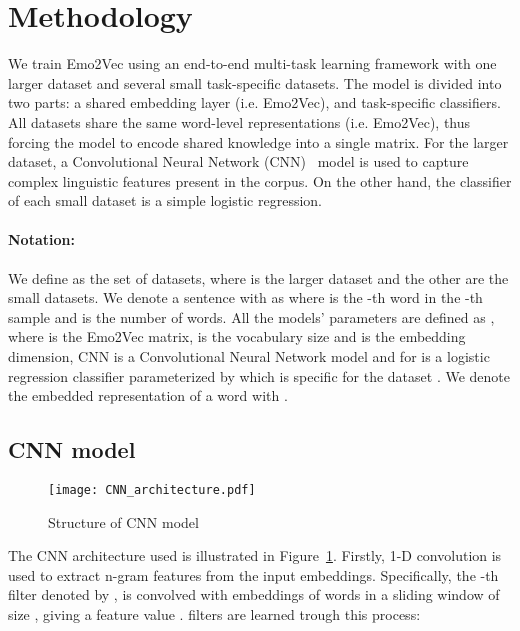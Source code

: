 \documentclass[11pt,a4paper]{article}
\begin{document}
\section{Methodology}
We train Emo2Vec using an end-to-end multi-task learning framework with one larger dataset and several small task-specific datasets. The model is divided into two parts: a shared embedding layer (i.e. Emo2Vec), and task-specific classifiers. All datasets share the same word-level representations (i.e. Emo2Vec), thus forcing the model to encode shared knowledge into a single matrix. For the larger dataset, a Convolutional Neural Network (CNN)~\cite{lecun1998gradient} model is used to capture complex linguistic features present in the corpus. On the other hand, the classifier of each small dataset is a simple logistic regression. 

\paragraph{Notation:} We define  as the set of  datasets, where  is the larger dataset and the other  are the small datasets. We denote a sentence  with  as  where  is the -th word in the -th sample and  is the number of words. All the models' parameters are defined as , where  is the Emo2Vec matrix,  is the vocabulary size and  is the embedding dimension, CNN is a Convolutional Neural Network model and  for  is a logistic regression classifier parameterized by  which is specific for the dataset . We denote the embedded representation of a word  with . 







\subsection{CNN model}
\begin{figure}[t]
  \centering
  \texttt{[image: CNN\_architecture.pdf]}
  \vspace{-10pt}
  
  \caption{Structure of CNN model}
  
  \vspace{-10pt}
  \label{fig:cnn_architecture}
\end{figure}

The CNN architecture used is illustrated in Figure~\ref{fig:cnn_architecture}.  
Firstly, 1-D convolution is used to extract n-gram features from the input embeddings.  Specifically, the -th filter denoted by , is convolved with embeddings of words in a sliding window of size , giving a feature value .  filters are learned trough this process:
\end{document}
